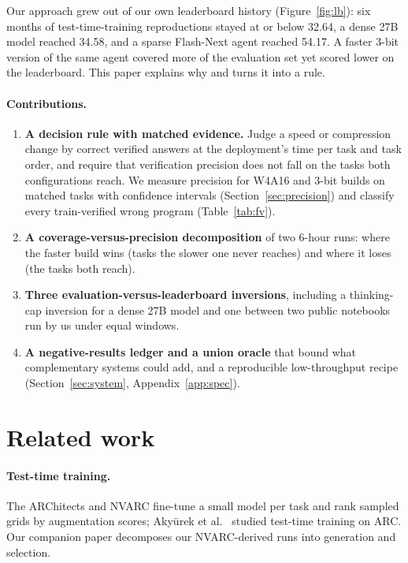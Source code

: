 \documentclass[11pt]{article}
\begin{document}
Our approach grew out of our own leaderboard history (Figure~\ref{fig:lb}): six months of test-time-training reproductions stayed at or below 32.64, a dense 27B model reached 34.58, and a sparse Flash-Next agent reached 54.17. A faster 3-bit version of the same agent covered more of the evaluation set yet scored lower on the leaderboard. This paper explains why and turns it into a rule.

\paragraph{Contributions.}
\begin{enumerate}
\item \textbf{A decision rule with matched evidence.} Judge a speed or compression change by correct verified answers at the deployment's time per task and task order, and require that verification precision does not fall on the tasks both configurations reach. We measure precision for W4A16 and 3-bit builds on matched tasks with confidence intervals (Section~\ref{sec:precision}) and classify every train-verified wrong program (Table~\ref{tab:fv}).
\item \textbf{A coverage-versus-precision decomposition} of two 6-hour runs: where the faster build wins (tasks the slower one never reaches) and where it loses (the tasks both reach).
\item \textbf{Three evaluation-versus-leaderboard inversions}, including a thinking-cap inversion for a dense 27B model and one between two public notebooks run by us under equal windows.
\item \textbf{A negative-results ledger and a union oracle} that bound what complementary systems could add, and a reproducible low-throughput recipe (Section~\ref{sec:system}, Appendix~\ref{app:spec}).
\end{enumerate}

\section{Related work}
\paragraph{Test-time training.} The ARChitects \cite{architects2024,architectspoe} and NVARC \cite{nvarc2025} fine-tune a small model per task and rank sampled grids by augmentation scores; Aky\"urek et al.\ \cite{akyurek2024} studied test-time training on ARC. Our companion paper \cite{paper1} decomposes our NVARC-derived runs into generation and selection.
\end{document}
